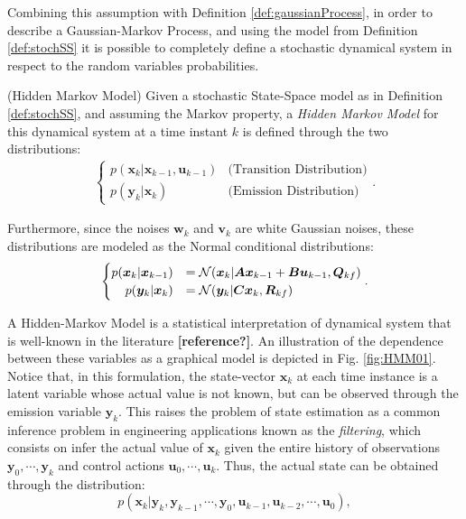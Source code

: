 \documentclass[a4paper,11pt]{book}
\numberwithin{figure}{chapter}
\numberwithin{equation}{chapter}
\numberwithin{table}{chapter}
\theoremstyle{definition}
\newtheorem{definition}{Definition}[chapter]
\newcounter{boxed-theorem}
\newcounter{boxed-definition}
\newenvironment{boxed-definition}[1]
{\begin{shaded} \begin{definition}{#1}}
{\end{definition} \end{shaded}}
\begin{document}
Combining this assumption with Definition \ref{def:gaussianProcess}, in order to describe a Gaussian-Markov Process, and using the model from Definition \ref{def:stochSS} it is possible to completely define a stochastic dynamical system in respect to the random variables probabilities.

\begin{boxed-definition}{(Hidden Markov Model)} \label{def:HMM}
    Given a stochastic State-Space model as in Definition \ref{def:stochSS}, and assuming the Markov property, a \textit{Hidden Markov Model} for this dynamical system at a time instant $k$ is defined through the two distributions:
    \begin{align}
    \begin{cases}
        p(\bm{x}_{k} | \bm{x}_{k-1}, \bm{u}_{k-1}) & \text{(Transition Distribution)} \\
        p(\bm{y}_{k} | \bm{x}_{k}) & \text{(Emission Distribution)}
    \end{cases}
    .\end{align}
    
    Furthermore, since the noises $\bm{w}_k$ and $\bm{v}_k$ are white Gaussian noises, these distributions are modeled as the Normal conditional distributions:
    \begin{align}
    \begin{cases}
        p(\bm{x}_{k} | \bm{x}_{k-1}) &= \mathcal{N}(\bm{x}_k | \bm{A}\bm{x}_{k-1} + \bm{B}\bm{u}_{k-1}, \bm{Q}_{kf}) \\
        \hfill p(\bm{y}_{k} | \bm{x}_{k}) &= \mathcal{N}(\bm{y}_k | \bm{C}\bm{x}_{k}, \bm{R}_{kf})
    \end{cases}
    .\end{align}
\end{boxed-definition}

A Hidden-Markov Model is a statistical interpretation of dynamical system that is well-known in the literature \textbf{[reference?]}. An illustration of the dependence between these variables as a graphical model is depicted in Fig. \ref{fig:HMM01}. Notice that, in this formulation, the state-vector $\bm{x}_k$ at each time instance is a latent variable whose actual value is not known, but can be observed through the emission variable $\bm{y}_k$. This raises the problem of state estimation as a common inference problem in engineering applications known as the \textit{filtering}, which consists on infer the actual value of $\bm{x}_k$ given the entire history of observations $\bm{y}_0, \cdots, \bm{y}_k$ and control actions $\bm{u}_0, \cdots, \bm{u}_k$. Thus, the actual state can be obtained through the distribution:
\begin{equation}
    p(\bm{x}_k | \bm{y}_{k}, \bm{y}_{k-1}, \cdots, \bm{y}_0, \bm{u}_{k-1}, \bm{u}_{k-2}, \cdots, \bm{u}_0)
,\end{equation}
\end{document}
